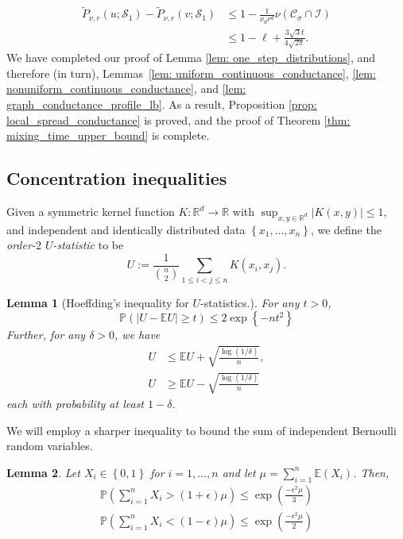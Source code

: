\documentclass[11pt,twoside]{article}
\newtheorem{lemma}{Lemma}
\newcommand{\set}[1]{\left\{#1\right\}}
\newcommand{\abs}[1]{\left \lvert #1 \right \rvert}
\newcommand{\Reals}{\mathbb{R}}
\newcommand{\Rd}{\Reals^d}
\newcommand{\1}{\mathbf{1}}
\newcommand{\Pbb}{\mathbb{P}}
\newcommand{\Ebb}{\mathbb{E}}
\newcommand{\Sset}{\mathcal{S}}
\newcommand{\Cset}{\mathcal{C}}
\newcommand{\Csig}{\Cset_{\sigma}}
\begin{document}
\begin{align*}
\widetilde{P}_{\nu,r}(u; \Sset_1) - \widetilde{P}_{\nu,r}(v; \Sset_1) & \leq  1 - \frac{1}{\nu_d r^d} \nu(\Csig \cap \mathcal{I}) \\
& \leq 1 - \ell + \frac{3 \sqrt{3} t}{4\sqrt{2\pi}}.
\end{align*}
We have completed our proof of Lemma \ref{lem: one_step_distributions}, and therefore (in turn), Lemmas~\ref{lem: uniform_continuous_conductance}, \ref{lem: nonuniform_continuous_conductance}, and \ref{lem: graph_conductance_profile_lb}. As a result, Proposition \ref{prop: local_spread_conductance} is proved, and the proof of Theorem \ref{thm: mixing_time_upper_bound} is complete.

\subsection{Concentration inequalities}
\label{sec: concentration}

Given a symmetric kernel function $K: \Rd \to \Reals$ with $\sup_{x,y \in \Rd} \abs{K(x,y)} \leq 1$, and independent and identically distributed data $\set{x_1, \ldots, x_n}$, we define the \textit{order-$2$ $U$-statistic} to be 
\begin{equation*}
U := \frac{1}{ {n \choose 2} } \sum_{1 \leq i < j \leq n} K(x_i,x_j).
\end{equation*}

\begin{lemma}[Hoeffding's inequality for $U$-statistics.]
	\label{lem: bounded_difference}
	For any $t > 0$,
	\begin{equation*}
	\mathbb{P}(\abs{U - \mathbb{E}U} \geq t) \leq 2 \exp\left\{-nt^2\right\}
	\end{equation*}
	Further, for any $\delta > 0$, we have
	\begin{align*}
	U & \leq \mathbb{E}U + \sqrt{\frac{\log(1 / \delta)}{n} }, \\
	U & \geq \mathbb{E}U - \sqrt{\frac{\log(1 / \delta)}{n} }
	\end{align*}
	each with probability at least $1 - \delta$. 
\end{lemma}

We will employ a sharper inequality to bound the sum of independent Bernoulli random variables.
\begin{lemma}
	\label{lem: multiplicative_Hoeffding}
	Let $X_i \in \set{0,1}$ for $i = 1, \ldots, n$ and let $\mu = \sum_{i = 1}^n \Ebb(X_i)$. Then,
	\begin{align*}
	\Pbb\left(\sum_{i=1}^{n}X_i > (1 + \epsilon) \mu \right) \leq \exp \left(\frac{-\epsilon^2 \mu}{3}\right) \\
	\Pbb\left(\sum_{i=1}^{n}X_i < (1 - \epsilon) \mu \right) \leq \exp \left(\frac{-\epsilon^2 \mu}{2}\right)
	\end{align*}
\end{lemma}
\end{document}
